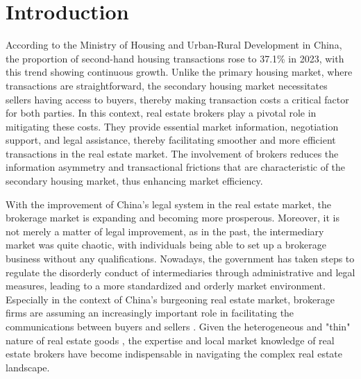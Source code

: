 \documentclass[11pt]{article}
\begin{document}
\clearpage
\egroup
\setcounter{page}{1}



\section{Introduction \label{sec:introduction}}

\noindent


According to the Ministry of Housing and Urban-Rural Development in China, the proportion of second-hand housing transactions rose to 37.1\% in 2023, with this trend showing continuous growth. Unlike the primary housing market, where transactions are straightforward, the secondary housing market necessitates sellers having access to buyers, thereby making transaction costs a critical factor for both parties. In this context, real estate brokers play a pivotal role in mitigating these costs. They provide essential market information, negotiation support, and legal assistance, thereby facilitating smoother and more efficient transactions in the real estate market. The involvement of brokers reduces the information asymmetry and transactional frictions that are characteristic of the secondary housing market, thus enhancing market efficiency. 

With the improvement of China's legal system in the real estate market, the brokerage market is expanding and becoming more prosperous. Moreover, it is not merely a matter of legal improvement, as in the past, the intermediary market was quite chaotic, with individuals being able to set up a brokerage business without any qualifications. Nowadays, the government has taken steps to regulate the disorderly conduct of intermediaries through administrative and legal measures, leading to a more standardized and orderly market environment. Especially in the context of China's burgeoning real estate market, brokerage firms are assuming an increasingly important role in facilitating the communications between buyers and sellers \citep{glaeser_real_2017}. Given the heterogeneous and "thin" nature of real estate goods \citep{HAN2015813}, the expertise and local market knowledge of real estate brokers have become indispensable in navigating the complex real estate landscape.
\end{document}
